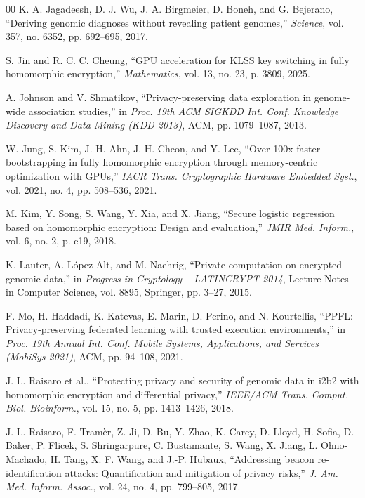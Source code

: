\documentclass[conference]{IEEEtran}
\begin{document}
\begin{thebibliography}{00}
K. A. Jagadeesh, D. J. Wu, J. A. Birgmeier, D. Boneh, and G. Bejerano,
``Deriving genomic diagnoses without revealing patient genomes,''
\textit{Science}, vol. 357, no. 6352, pp. 692--695, 2017.

S. Jin and R. C. C. Cheung, ``GPU acceleration for KLSS key switching in fully
homomorphic encryption,'' \textit{Mathematics}, vol. 13, no. 23, p. 3809, 2025.

A. Johnson and V. Shmatikov, ``Privacy-preserving data exploration in
genome-wide association studies,'' in \textit{Proc. 19th ACM SIGKDD Int. Conf.
Knowledge Discovery and Data Mining (KDD 2013)}, ACM, pp. 1079--1087, 2013.

W. Jung, S. Kim, J. H. Ahn, J. H. Cheon, and Y. Lee, ``Over 100x faster
bootstrapping in fully homomorphic encryption through memory-centric
optimization with GPUs,'' \textit{IACR Trans. Cryptographic Hardware Embedded
Syst.}, vol. 2021, no. 4, pp. 508--536, 2021.

M. Kim, Y. Song, S. Wang, Y. Xia, and X. Jiang, ``Secure logistic regression
based on homomorphic encryption: Design and evaluation,'' \textit{JMIR Med.
Inform.}, vol. 6, no. 2, p. e19, 2018.

K. Lauter, A. L\'opez-Alt, and M. Naehrig, ``Private computation on encrypted
genomic data,'' in \textit{Progress in Cryptology -- LATINCRYPT 2014}, Lecture
Notes in Computer Science, vol. 8895, Springer, pp. 3--27, 2015.

F. Mo, H. Haddadi, K. Katevas, E. Marin, D. Perino, and N. Kourtellis,
``PPFL: Privacy-preserving federated learning with trusted execution
environments,'' in \textit{Proc. 19th Annual Int. Conf. Mobile Systems,
Applications, and Services (MobiSys 2021)}, ACM, pp. 94--108, 2021.

J. L. Raisaro et al., ``Protecting privacy and security of genomic data in
i2b2 with homomorphic encryption and differential privacy,'' \textit{IEEE/ACM
Trans. Comput. Biol. Bioinform.}, vol. 15, no. 5, pp. 1413--1426, 2018.

J. L. Raisaro, F. Tram\`er, Z. Ji, D. Bu, Y. Zhao, K. Carey, D. Lloyd,
H. Sofia, D. Baker, P. Flicek, S. Shringarpure, C. Bustamante, S. Wang,
X. Jiang, L. Ohno-Machado, H. Tang, X. F. Wang, and J.-P. Hubaux, ``Addressing
beacon re-identification attacks: Quantification and mitigation of privacy
risks,'' \textit{J. Am. Med. Inform. Assoc.}, vol. 24, no. 4, pp. 799--805,
2017.


\end{thebibliography}
\end{document}
